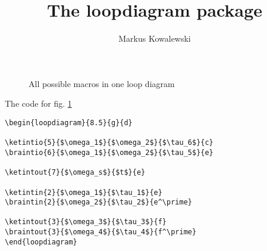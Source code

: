 \documentclass[12pt,letterpaper]{article}
\title{The loopdiagram package}
\author{Markus Kowalewski}
\begin{document}
\maketitle

\begin{figure}
\centering
{}
\caption{All possible macros in one loop diagram}
\label{fig:diagall}
\end{figure}

The code for fig. \ref{fig:diagall}
\begin{verbatim}
\begin{loopdiagram}{8.5}{g}{d}

\ketintio{5}{$\omega_1$}{$\omega_2$}{$\tau_6$}{c}
\braintio{6}{$\omega_1$}{$\omega_2$}{$\tau_5$}{e}

\ketintout{7}{$\omega_s$}{$t$}{e}

\ketintin{2}{$\omega_1$}{$\tau_1$}{e}
\braintin{2}{$\omega_2$}{$\tau_2$}{e^\prime}

\ketintout{3}{$\omega_3$}{$\tau_3$}{f}
\braintout{3}{$\omega_4$}{$\tau_4$}{f^\prime}
\end{loopdiagram}
\end{verbatim}
\end{document}
